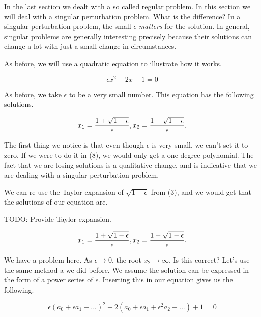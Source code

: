 \documentclass[12pt]{article}
\begin{document}
In the last section we dealt with a so called regular problem. In this section
we will deal with a singular perturbation problem. What is the difference? In a
singular perturbation problem, the small $\epsilon$ \textit{matters} for the
solution. In general, singular problems are generally interesting precisely
because their solutions can change a lot with just a small change in
circumstances.

As before, we will use a quadratic equation to illustrate how it works.

\begin{equation}
\epsilon x^2 - 2 x + 1 = 0
\end{equation}

As before, we take $\epsilon$ to be a very small number. This equation has the
following solutions.

\begin{equation}
x_1 = \frac{1 + \sqrt{1 - \epsilon}}{\epsilon}, \\
x_2 = \frac{1 - \sqrt{1 - \epsilon}}{\epsilon}.
\end{equation}

The first thing we notice is that even though $\epsilon$ is very small, we can't
set it to zero. If we were to do it in (8), we would only get a one degree
polynomial. The fact that we are losing solutions is a qualitative change, and
is indicative that we are dealing with a singular perturbation problem.

We can re-use the Taylor expansion of $\sqrt{1 - \epsilon}$ from (3), and we
would get that the solutions of our equation are.

TODO: Provide Taylor expansion.

\begin{equation}
x_1 = \frac{1 + \sqrt{1 - \epsilon}}{\epsilon}, \\
x_2 = \frac{1 - \sqrt{1 - \epsilon}}{\epsilon}.
\end{equation}

We have a problem here. As $\epsilon \to 0$, the root $x_2 \to \infty$. Is this
correct? Let's use the same method a we did before. We assume the solution can
be expressed in the form of a power series of $\epsilon$. Inserting this in our
equation gives us the following.

\begin{equation}
\epsilon (a_0 + \epsilon a_1 + ...)^2 - 2(a_0 + \epsilon a_1 + \epsilon^2 a_2 +
...) + 1 = 0
\end{equation}
\end{document}
